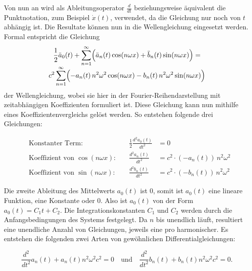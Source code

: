 Von nun an wird als Ableitungsoperator $\frac{d}{dt}$ beziehungsweise äquivalent die Punktnotation, zum Beispiel $\dot{x}(t)$, verwendet, da die Gleichung nur noch von $t$ abhängig ist. Die Resultate können nun in die Wellengleichung eingesetzt werden. 
Formal entspricht die Gleichung
\begin{multline}
	\frac{1}{2}\ddot{a}_0(t)
	+ \sum_{n=1}^{\infty}\Bigl(
	\ddot{a}_n(t)\cos(n\omega x)
	+ \ddot{b}_n(t)\sin(n\omega x)
	\Bigr)
	= \\[-0.8ex]
	c^2 \sum_{n=1}^{\infty}\Bigl(
	-a_n(t)\,n^2\omega^2\cos(n\omega x)
	-b_n(t)\,n^2\omega^2\sin(n\omega x)
	\Bigr)
\end{multline}
der Wellengleichung, wobei sie hier in der Fourier-Reihendarstellung mit zeitabhängigen Koeffizienten formuliert ist.
Diese Gleichung kann nun mithilfe eines Koeffizientenvergleichs gelöst werden.
So entstehen folgende drei Gleichungen:

\begin{equation}
	\begin{alignedat}{2}
		&\text{Konstanter Term:} 
		&\quad \frac{1}{2} \frac{d^2 a_0(t)}{dt^2} &= 0 \\[0.8em]
		&\text{Koeffizient von }\cos(n\omega x): 
		&\quad \frac{d^2 a_n(t)}{dt^2} &= c^2 \cdot (-a_n(t))\,n^2\omega^2 \\[0.8em]
		&\text{Koeffizient von }\sin(n\omega x): 
		&\quad \frac{d^2 b_n(t)}{dt^2} &= c^2 \cdot (-b_n(t))\,n^2\omega^2
	\end{alignedat}
\end{equation}

Die zweite Ableitung des Mittelwerts $a_0(t)$ ist 0, somit ist $a_0(t)$ eine lineare Funktion, eine Konstante oder 0. Also ist $a_0(t)$ von der Form $a_0(t)=C_1 t + C_2$.
Die Integrationskonstanten $C_1$ und $C_2$ werden durch die Anfangsbedingungen des Systems festgelegt.
Da $n$ bis unendlich läuft, resultiert eine unendliche Anzahl von Gleichungen, jeweils eine pro harmonischer.
Es entstehen die folgenden zwei Arten von gewöhnlichen Differentialgleichungen:

\begin{equation}\label{eq:ODE_Wellengleichung}
	\frac{d^2}{dt^2} a_n(t) + a_n(t) n^2 \omega^2 c^2 = 0
	  \quad   \text{und} \quad  \frac{d^2}{dt^2} b_n(t) + b_n(t) n^2 \omega^2 c^2 = 0.
\end{equation}

